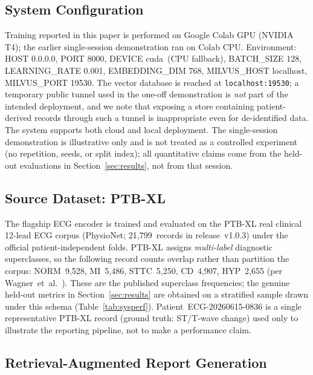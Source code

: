 \documentclass[AMA,STIX1COL,]{WileyNJD-v2}
\begin{document}
\subsection{System Configuration}

Training reported in this paper is performed on Google Colab GPU
(NVIDIA T4); the earlier single-session demonstration ran on Colab CPU.
Environment: HOST 0.0.0.0, PORT 8000, DEVICE cuda~(CPU fallback),
BATCH\_SIZE 128, LEARNING\_RATE 0.001, EMBEDDING\_DIM 768,
MILVUS\_HOST localhost, MILVUS\_PORT 19530. The vector database is
reached at \texttt{localhost:19530}; a temporary public tunnel used in
the one-off demonstration is \emph{not} part of the intended
deployment, and we note that exposing a store containing patient-derived
records through such a tunnel is inappropriate even for de-identified
data. The system supports both cloud and local deployment. The
single-session demonstration is illustrative only and is not treated as
a controlled experiment (no repetition, seeds, or split index); all
quantitative claims come from the held-out evaluations in
Section~\ref{sec:results}, not from that session.

\subsection{Source Dataset: PTB-XL}

The flagship ECG encoder is trained and evaluated on the PTB-XL
real clinical 12-lead ECG corpus (PhysioNet; 21{,}799~records in
release~v1.0.3) under the official patient-independent folds. PTB-XL
assigns \emph{multi-label} diagnostic superclasses, so the following
record counts overlap rather than partition the corpus: NORM~9{,}528,
MI~5{,}486, STTC~5{,}250, CD~4{,}907, HYP~2{,}655 (per
Wagner~et~al.~\cite{wagner2020ptbxl}). These are the published
superclass frequencies; the genuine held-out metrics in
Section~\ref{sec:results} are obtained on a stratified sample drawn
under this schema (Table~\ref{tab:sysperf}). Patient~ECG-20260615-0836
is a single representative PTB-XL record (ground truth: ST/T-wave
change) used only to illustrate the reporting pipeline, not to make a
performance claim.

\subsection{Retrieval-Augmented Report Generation}
\end{document}
